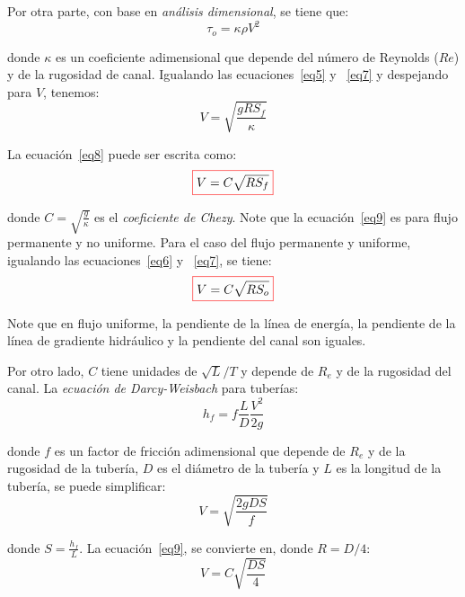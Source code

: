 \documentclass[11pt, oneside]{article}
\begin{document}
Por otra parte, con base en \emph{an\'alisis dimensional}, se tiene que:
\begin{equation}
\tau_o = \kappa \rho V^2
\label{eq7}
\end{equation}

donde $\kappa$ es un coeficiente adimensional que depende del n\'umero de Reynolds ($Re$) y de la rugosidad de canal. Igualando las ecuaciones~\ref{eq5} y ~\ref{eq7} y despejando para $V$, tenemos:
\begin{equation}
V = \sqrt{\frac{g R S_f}{\kappa}}
\label{eq8}
\end{equation}

La ecuaci\'on~\ref{eq8} puede ser escrita como:
\begin{equation}
\color{red}\boxed{\color{black} V = C\sqrt{R S_f}}
\label{eq9}
\end{equation}

donde $C = \sqrt{\frac{g}{\kappa}}$ es el  \emph{coeficiente de Chezy}. Note que la ecuaci\'on~\ref{eq9} es para flujo permanente y no uniforme. Para el caso del flujo permanente y uniforme, igualando las ecuaciones~\ref{eq6} y ~\ref{eq7}, se tiene:
\begin{equation}
\color{red}\boxed{\color{black} V = C\sqrt{R S_o}}
\label{eq10}
\end{equation}

Note que en flujo uniforme, la pendiente de la l\'inea de energ\'ia, la pendiente de la l\'inea de gradiente hidr\'aulico y la pendiente del canal son iguales.

Por otro lado, $C$ tiene unidades de $\sqrt{L}/T$ y depende de $R_e$ y de la rugosidad del canal. La \emph{ecuaci\'on de Darcy-Weisbach} para tuber\'ias:
\begin{equation}
h_f = f\frac{L}{D}\frac{V^2}{2g}
\label{eq11}
\end{equation}

donde $f$ es un factor de fricci\'on adimensional que depende de $R_e$ y de la rugosidad de la tuber\'ia, $D$ es el di\'ametro de la tuber\'ia y $L$ es la longitud de la tuber\'ia, se puede simplificar:
\begin{equation}
V = \sqrt{\frac{2g D S}{f}}
\label{eq12}
\end{equation}

donde $S = \frac{h_f}{L}$. La ecuaci\'on~\ref{eq9}, se convierte en, donde $R=D/4$:
\begin{equation}
V = C\sqrt{\frac{D S}{4}}
\label{eq13}
\end{equation}
\end{document}

